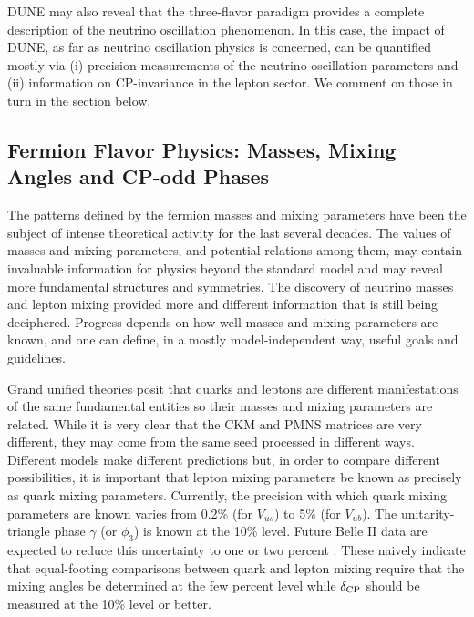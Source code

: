 DUNE may also reveal that the three-flavor paradigm provides a complete description of the neutrino oscillation phenomenon. In this case, the impact of DUNE, as far as neutrino oscillation physics is concerned, can be quantified mostly via (i) precision measurements of the neutrino oscillation parameters and (ii) information on CP-invariance in the lepton sector. We comment on those in turn in the section below.


\subsection{Fermion Flavor Physics: Masses, Mixing Angles 
   and CP-odd Phases}

The patterns defined by the fermion masses and mixing parameters have been the subject of intense theoretical activity for the last several decades. The values of masses and mixing parameters, and potential relations among them, may contain invaluable information for physics beyond the standard model and may reveal more fundamental structures and symmetries. The discovery of neutrino masses and lepton mixing provided more and different information that is still being deciphered. Progress depends on how well masses and mixing parameters are known, and one can define, in a mostly model-independent way, useful goals and guidelines. 

Grand unified theories posit that quarks and leptons are different manifestations of the same fundamental entities so their masses and mixing parameters are related. While it is very clear that the CKM and PMNS matrices are very different, they may come from the same seed processed in different ways. Different models make different predictions but, in order to compare different possibilities, it is important that lepton mixing parameters be known as precisely as quark mixing parameters. Currently, the precision with which quark mixing parameters are known \cite{Tanabashi:2018oca} varies from 0.2\% (for $V_{us}$) to 5\% (for $V_{ub}$). The unitarity-triangle phase $\gamma$ (or $\phi_3$) is known at the 10\% level. Future Belle II data are expected to reduce this uncertainty to one or two percent \cite{Kou:2018nap}. These naively indicate that equal-footing comparisons between quark and lepton mixing require that the mixing angles be determined at the few percent level while $\delta_{\rm CP}$ should be measured at the 10\% level or better.

